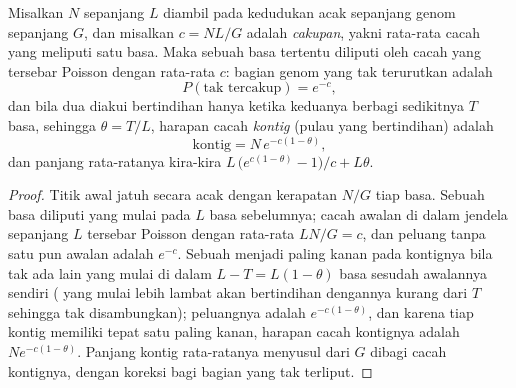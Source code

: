 \begin{theorem}\label{thm:b3:genomics:lander-waterman}
Misalkan $N$  sepanjang $L$ diambil pada kedudukan acak sepanjang
genom sepanjang $G$, dan misalkan $c = NL/G$ adalah \emph{cakupan}, yakni
rata-rata cacah  yang meliputi satu basa. Maka sebuah basa tertentu
diliputi oleh cacah  yang tersebar Poisson dengan rata-rata $c$: bagian
genom yang tak terurutkan adalah
\[
P(\text{tak tercakup}) = e^{-c},
\]
dan bila dua  diakui bertindihan hanya ketika keduanya berbagi
sedikitnya $T$ basa, sehingga $\theta = T/L$, harapan cacah
\emph{kontig} (pulau  yang bertindihan) adalah
\[
\text{kontig} = N\,e^{-c(1-\theta)},
\]
dan panjang rata-ratanya kira-kira $L\,\bigl(e^{c(1-\theta)} - 1\bigr)/c + L\theta$.
\end{theorem}
\begin{proof}
Titik awal  jatuh secara acak dengan kerapatan $N/G$ tiap basa. Sebuah
basa diliputi  yang mulai pada $L$ basa sebelumnya; cacah awalan di
dalam jendela sepanjang $L$ tersebar Poisson dengan rata-rata $LN/G
= c$, dan peluang tanpa satu pun awalan adalah $e^{-c}$. Sebuah  menjadi
 paling kanan pada kontignya bila tak ada  lain yang mulai di
dalam $L - T = L(1-\theta)$ basa sesudah awalannya sendiri ( yang mulai
lebih lambat akan bertindihan dengannya kurang dari $T$ sehingga tak
disambungkan); peluangnya adalah $e^{-c(1-\theta)}$, dan karena tiap kontig
memiliki tepat satu  paling kanan, harapan cacah kontignya adalah
$N e^{-c(1-\theta)}$. Panjang kontig rata-ratanya menyusul dari $G$ dibagi
cacah kontignya, dengan koreksi bagi bagian yang tak terliput.
\end{proof}

